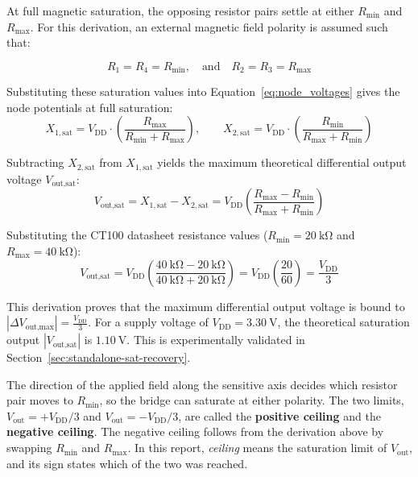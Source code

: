 \documentclass[12pt,a4paper]{article}
\begin{document}
 At full magnetic saturation, the opposing resistor pairs settle at either $R_{\min}$ and $R_{\max}$. For this derivation, an external magnetic field polarity is assumed such that:

\begin{equation}
R_1 = R_4 = R_{\min}, \quad \text{and} \quad R_2 = R_3 = R_{\max}
\label{eq:tmr-saturation-resistances}
\end{equation}

Substituting these saturation values into Equation~\ref{eq:node_voltages} gives the node potentials at full saturation:
\begin{equation}
    X_{1,\text{sat}} = V_{\text{DD}} \cdot \left( \frac{R_{\max}}{R_{\min} + R_{\max}} \right), \qquad X_{2,\text{sat}} = V_{\text{DD}} \cdot \left( \frac{R_{\min}}{R_{\max} + R_{\min}} \right)
\end{equation}

Subtracting $X_{2,\text{sat}}$ from $X_{1,\text{sat}}$ yields the maximum theoretical differential output voltage $V_{\text{out,sat}}$:
\begin{equation}
    V_{\text{out,sat}} = X_{1,\text{sat}} - X_{2,\text{sat}} = V_{\text{DD}} \left( \frac{R_{\max} - R_{\min}}{R_{\max} + R_{\min}} \right)
    \label{eq:vout_sat_derived}
\end{equation}

Substituting the CT100 datasheet resistance values \cite{ct100_datasheet} ($R_{\min} = \SI{20}{\kilo\ohm}$ and $R_{\max} = \SI{40}{\kilo\ohm}$):
\begin{equation}
    V_{\text{out,sat}} = V_{\text{DD}} \left( \frac{\SI{40}{\kilo\ohm} - \SI{20}{\kilo\ohm}}{\SI{40}{\kilo\ohm} + \SI{20}{\kilo\ohm}} \right) = V_{\text{DD}} \left( \frac{20}{60} \right) = \frac{V_{\text{DD}}}{3}
\end{equation}

This  derivation proves that the maximum differential output voltage is  bound to  $\left| \Delta V_{\text{out,max}} \right| = \frac{V_{\text{DD}}}{3}$. For a supply voltage of $V_{\text{DD}} = \SI{3.30}{\volt}$, the theoretical saturation output  $\left|V_{\text{out,sat}} \right|$ is $ \SI{1.10}{\volt}$. This is experimentally validated in Section~\ref{sec:standalone-sat-recovery}.

The direction of the applied field along the sensitive axis decides which resistor pair moves to $R_{\min}$, so the bridge can saturate at either polarity. The two limits, $V_{\text{out}} = +V_{\text{DD}}/3$ and $V_{\text{out}} = -V_{\text{DD}}/3$, are called the \textbf{positive ceiling} and the \textbf{negative ceiling}. The negative ceiling follows from the derivation above by swapping $R_{\min}$ and $R_{\max}$. In this report, \emph{ceiling} means the saturation limit of $V_{\text{out}}$, and its sign states which of the two was reached.
\end{document}
